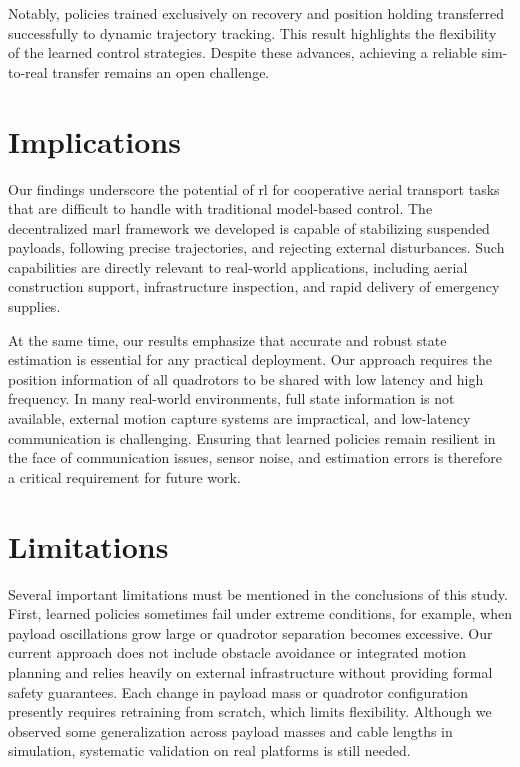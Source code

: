 Notably, policies trained exclusively on recovery and position holding transferred successfully to dynamic trajectory tracking. This result highlights the flexibility of the learned control strategies. Despite these advances, achieving a reliable sim-to-real transfer remains an open challenge.

\section{Implications}
Our findings underscore the potential of \gls{rl} for cooperative aerial transport tasks that are difficult to handle with traditional model-based control. The decentralized \gls{marl} framework we developed is capable of stabilizing suspended payloads, following precise trajectories, and rejecting external disturbances. Such capabilities are directly relevant to real-world applications, including aerial construction support, infrastructure inspection, and rapid delivery of emergency supplies.

At the same time, our results emphasize that accurate and robust state estimation is essential for any practical deployment. Our approach requires the position information of all quadrotors to be shared with low latency and high frequency. In many real-world environments, full state information is not available, external motion capture systems are impractical, and low-latency communication is challenging. Ensuring that learned policies remain resilient in the face of communication issues, sensor noise, and estimation errors is therefore a critical requirement for future work.

\section{Limitations}
Several important limitations must be mentioned in the conclusions of this study. First, learned policies sometimes fail under extreme conditions, for example, when payload oscillations grow large or quadrotor separation becomes excessive. Our current approach does not include obstacle avoidance or integrated motion planning and relies heavily on external infrastructure without providing formal safety guarantees. Each change in payload mass or quadrotor configuration presently requires retraining from scratch, which limits flexibility. Although we observed some generalization across payload masses and cable lengths in simulation, systematic validation on real platforms is still needed.

